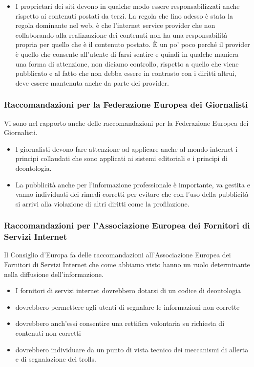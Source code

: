 \begin{itemize}
    \item I proprietari dei siti devono in qualche modo essere responsabilizzati anche rispetto ai contenuti postati da terzi. La regola che fino adesso è stata la regola dominante nel web, è che l'internet service provider che non collaborando alla realizzazione dei contenuti non ha una responsabilità propria per quello che è il contenuto postato. È un po' poco perché il provider è quello che consente all'utente di farsi sentire e quindi in qualche maniera una forma di attenzione, non diciamo controllo, rispetto a quello che viene pubblicato e al fatto che non debba essere in contrasto con i diritti altrui, deve essere mantenuta anche da parte dei provider. 
\end{itemize}


\subsubsection{Raccomandazioni per la Federazione Europea dei Giornalisti}
Vi sono nel rapporto anche delle raccomandazioni per la Federazione Europea dei Giornalisti. 

\begin{itemize}
    \item I giornalisti devono fare attenzione ad applicare anche al mondo internet i principi collaudati che sono applicati ai sistemi editoriali e i principi di deontologia.
    \item La pubblicità anche per l'informazione professionale è importante, va gestita e vanno individuati dei rimedi corretti per evitare che con l'uso della pubblicità si arrivi alla violazione di altri diritti come la profilazione. 
\end{itemize}

\subsubsection{Raccomandazioni per l'Associazione Europea dei Fornitori di Servizi Internet}

Il Consiglio d'Europa fa delle raccomandazioni all'Associazione Europea dei Fornitori di Servizi Internet che come abbiamo visto hanno un ruolo determinante nella diffusione dell'informazione. 

\begin{itemize}
    \item I fornitori di servizi internet dovrebbero dotarsi di un codice di deontologia 
    \item dovrebbero permettere agli utenti di segnalare le informazioni non corrette 
    \item dovrebbero anch'essi consentire una rettifica volontaria su richiesta di contenuti non corretti
    \item dovrebbero individuare da un punto di vista tecnico dei meccanismi di allerta e di segnalazione dei trolls.
\end{itemize}

